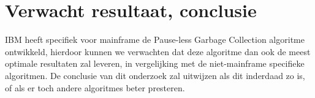





\section{Verwacht resultaat, conclusie}%
\label{sec:verwachte_resultaten}

IBM heeft specifiek voor mainframe de  Pause-less Garbage Collection algoritme ontwikkeld, hierdoor kunnen we verwachten dat deze algoritme dan ook de meest optimale resultaten zal leveren, in vergelijking met de niet-mainframe specifieke algoritmen.
De conclusie van dit onderzoek zal uitwijzen als dit inderdaad zo is, of als er toch andere algoritmes beter presteren.

